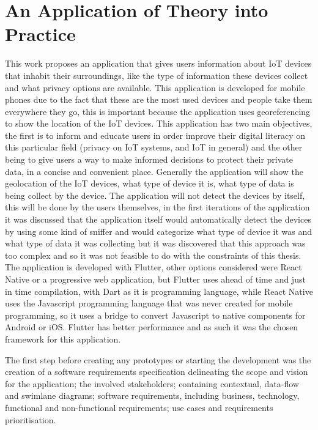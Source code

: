 %
%
\section{An Application of Theory into Practice}
\label{section:stage2}

This work proposes an application that gives users information about IoT
devices that inhabit their surroundings, like the type of information these devices
collect and what privacy options are available. This application is developed
for mobile phones due to the fact that these are the most used devices
and people take them everywhere they go, this is important because the application
uses georeferencing to show the location of the IoT devices. This application
has two main objectives, the first is to inform and educate users in order improve
their digital literacy on this particular field (privacy on IoT systems, and
IoT in general) and the other being to give users a way to make informed decisions
to protect their private data, in a concise and convenient place. Generally
the application will show the geolocation of the IoT devices, what type of
device it is, what type of data is being collect by the device. The application
will not detect the devices by itself, this will be done by the users themselves,
in the first iterations of the application it was discussed that the application
itself would automatically detect the devices by using some kind of sniffer
and would categorize what type of device it was and what type of data it
was collecting but it was discovered that this approach was too complex and
so it was not feasible to do with the constraints of this thesis. The application
is developed with Flutter, other options considered were React Native or a
progressive web application, but Flutter uses ahead of time and just in time
compilation, with Dart as it is programming language, while React Native uses
the Javascript programming language that was never created for mobile programming,
so it uses a bridge to convert Javascript to native components for Android
or iOS. Flutter has better performance and as such it was the chosen framework
for this application.

The first step before creating any prototypes or starting the development was
the creation of a software requirements specification
delineating the scope and vision for the application; the involved stakeholders;
containing contextual, data-flow and swimlane diagrams; software requirements, including
business, technology, functional and non-functional requirements; use cases
and requirements prioritisation.

